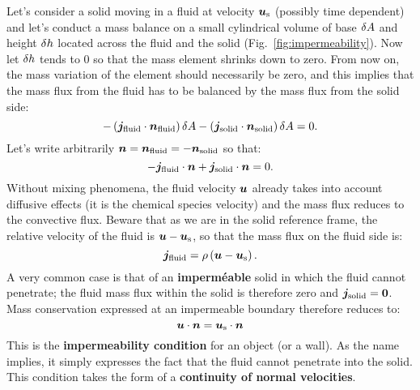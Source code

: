 Let's consider a solid moving in a fluid at velocity $\bu_\text s$ (possibly time dependent) and let's conduct a mass balance on a small cylindrical volume of base $\delta A$ and height $\delta h$ located across the fluid and the solid (Fig.~\ref{fig:impermeability}). Now let $\delta h$ tends to 0 so that the mass element shrinks down to zero.  From now on, the mass variation of the element should necessarily be zero, and this implies that the mass flux from the fluid has to be balanced by the mass flux from the solid side:
\begin{equation}
-\lp\bj_\text{fluid}\cdot \bn_\text{fluid}\rp \delA -  \lp\bj_\text{solid}\cdot \bn_\text{solid}\rp \delA = 0.
\end{equation}
Let's write arbitrarily $\bn = \bn_\text{fluid} = - \bn_\text{solid}$ so that:
\begin{equation}
-\bj_\text{fluid}\cdot \bn +  \bj_\text{solid}\cdot \bn = 0.
\end{equation}
Without mixing phenomena, the fluid velocity $\bu$ already takes into account diffusive effects (it is the chemical species velocity) and the mass flux reduces to the convective flux. Beware that as we are in the solid reference frame, the relative velocity of the fluid is $\bu - \bu_\text s$, so that the mass flux on the fluid side is:
\begin{equation}
\bj_\text{fluid} = \rho \lp\bu-\bu_\text s\rp.
\end{equation}
 A very common case is that of an \textbf{imperméable} solid in which the fluid cannot penetrate; the fluid mass flux within the solid is therefore zero and $\bj_\text{solid} = \boldsymbol 0$. Mass conservation expressed at an impermeable boundary therefore reduces to:
\begin{equation}
\bu\cdot\bn = \bu_\text s \cdot\bn
\label{eq:impermeability}
\end{equation}
This is the \textbf{impermeability condition} for an object (or a wall). As the name implies, it simply expresses the fact that the fluid cannot penetrate into the solid. This condition takes the form of a \textbf{continuity of normal velocities}.
%
